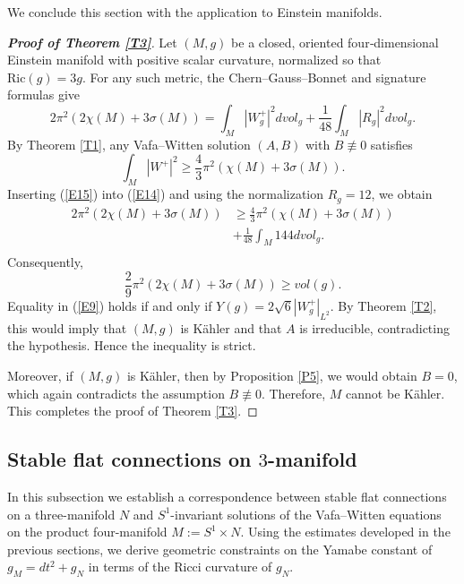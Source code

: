 \documentclass[12pt, twoside]{article}
\theoremstyle{definition}
\numberwithin{equation}{section}
\begin{document}
We conclude this section with the application to Einstein manifolds.
\begin{proof}[\textbf{Proof of Theorem \ref{T3}}]
Let $(M,g)$ be a closed, oriented four‑dimensional Einstein manifold with positive scalar curvature, normalized so that $\mathrm{Ric}(g)=3g$. For any such metric, the Chern–Gauss–Bonnet and signature formulas give
\begin{equation}\label{E14}
2\pi^{2}(2\chi(M)+3\sigma(M))=\int_{M}|W^{+}_{g}|^{2}dvol_{g}+\frac{1}{48}\int_{M}|R_{g}|^{2}dvol_{g}.
\end{equation}
By Theorem \ref{T1}, any Vafa–Witten solution $(A,B)$ with $B\not\equiv0$ satisfies
\begin{equation}\label{E15}
\int_{M}|W^{+}|^{2}\geq\frac{4}{3}\pi^{2}(\chi(M)+3\sigma(M)).
\end{equation}
Inserting (\ref{E15}) into (\ref{E14}) and using the normalization $R_{g}=12$, we obtain
\begin{equation*}
\begin{split}
2\pi^{2}(2\chi(M)+3\sigma(M))&\geq\frac{4}{3}\pi^{2}(\chi(M)+3\sigma(M))\\
&+\frac{1}{48}\int_{M}144dvol_{g}.\\
\end{split}
\end{equation*}
Consequently,
\begin{equation}\label{E9}
\frac{2}{9}\pi^{2}(2\chi(M)+3\sigma(M))\geq vol(g).
\end{equation}
Equality in (\ref{E9}) holds if and only if $Y(g)=2\sqrt{6}|W^{+}_{g}|_{L^{2}}$. By Theorem \ref{T2}, this would imply that $(M,g)$ is Kähler and that $A$ is irreducible, contradicting the hypothesis. Hence the inequality is strict. 

Moreover, if $(M,g)$ is K\"{a}hler, then by Proposition \ref{P5}, we would obtain  $B=0$, which again contradicts the assumption $B\not\equiv0$. Therefore, $M$ cannot be K\"{a}hler. This completes the proof of Theorem \ref{T3}.
\end{proof}




\subsection{Stable flat connections on $3$-manifold}\label{sec:dimred} 

In this subsection we establish a correspondence between stable flat connections on a three-manifold $N$ 
and $S^{1}$-invariant solutions of the Vafa--Witten equations on the product four-manifold $M:=S^{1}\times N$. 
Using the estimates developed in the previous sections, we derive geometric constraints on the Yamabe constant of $g_{M}=dt^{2}+g_{N}$ in terms of the Ricci curvature of $g_{N}$.
\end{document}
